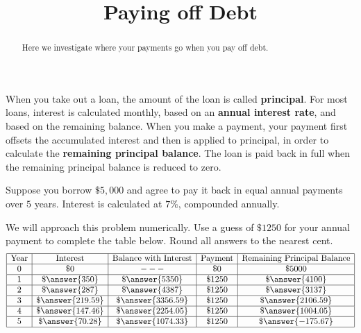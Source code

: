 \documentclass{ximera}
\title{Paying off Debt}
\begin{document}
\begin{abstract}
Here we investigate where your payments go when you pay off debt.
\end{abstract}
\maketitle

When you take out a loan, the amount of the loan is called
\textbf{principal}.  For most loans, interest is calculated monthly,
based on an \textbf{annual interest rate}, and based on the remaining
balance.  When you make a payment, your payment first offsets the
accumulated interest and then is applied to principal, in order to
calculate the \textbf{remaining principal balance}.  The loan is paid
back in full when the remaining principal balance is reduced to zero.

\begin{question}[1in]
Suppose you borrow $\$5,000$ and agree to pay it back in equal annual
payments over $5$ years.  Interest is calculated at $7\%$,
compounded annually. 


We will approach this problem numerically.  Use a guess of $\$1250$
for your annual payment to complete the table below. Round
all answers to the nearest cent.
\[
  \begin{array}{|c|c|c|c|c|}
    \hline
    \text{Year} & \text{Interest}             & \text{Balance with Interest} & \text{Payment}    & \text{Remaining Principal Balance}\\ \hline
    0  & \$ 0               & ---                   & \$ 0     & \$ 5000 \\ \hline
    1  & \$ \answer{350}    & \$ \answer{5350}    & \$ 1250  & \$ \answer{4100} \\ \hline
    2  & \$ \answer{287}    & \$ \answer{4387}    & \$ 1250  & \$ \answer{3137} \\ \hline
    3  & \$ \answer{219.59} & \$ \answer{3356.59} & \$ 1250  & \$ \answer{2106.59} \\ \hline
    4  & \$ \answer{147.46} & \$ \answer{2254.05} & \$ 1250  & \$ \answer{1004.05} \\ \hline
    5  & \$ \answer{70.28}  & \$ \answer{1074.33} & \$ 1250  & \$ \answer{-175.67} \\ \hline
  \end{array}
\]

\end{question}
\end{document}
